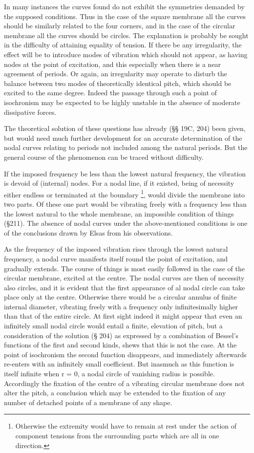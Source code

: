 In many instances the curves found do not exhibit the symmetries demanded by
the supposed conditions.  Thus in the case of the square membrane all the
curves should be similarly related to the four corners, and in the case of the
circular membrane all the curves should be circles.
The explanation is probably be sought in the difficulty of
attaining equality of tension. If there be any irregularity, the effect
will be to introduce modes of vibration which should not appear, as
having nodes at the point of excitation, and this especially when there
is a near agreement of periods. Or again, an irregularity may operate to
disturb the balance between two modes of theoretically identical pitch,
which should be excited to the same degree. Indeed the passage through
such a point of isochronism may be expected to be highly unstable in the
absence of moderate dissipative forces.

The theoretical solution of these questions has already (§§ 19C, 204)
been given, but would need much further development for an accurate
determination of the nodal curves relating to periods not included among
the natural periods. But the general course of the phenomenon can be
traced without difficulty.

If the imposed frequency be less than the lowest natural frequency, the
vibration is devoid of (internal) nodes. For a nodal line, if it
existed, being of necessity either endless or terminated at the boundary
\footnote{Otherwise the extremity would have to remain at rest under the action
of component tensions from the surrounding parts which are all in one direction.},
would divide the membrane into two parts. Of these one part would be
vibrating freely with a frequency less than the lowest natural to the
whole membrane, an impossible condition of things (§211). The absence of
nodal curves under the above-mentioned conditions is one of the
conclusions drawn by Elsas from his observations.

As the frequency of the imposed vibration rises through the lowest
natural frequency, a nodal curve manifests itself round the point of
excitation, and gradually extends. The course of things is most easily
followed in the case of the circular membrane, excited at the centre.
The nodal curves are then of necessity also circles, and it is evident
that the first appearance of al nodal circle can take place only at the
centre. Otherwise there would be a circular annulus of finite internal
diameter, vibrating freely with a frequency only infinitesimally higher
than that of the entire circle. At first sight indeed it might appear
that even an infinitely small nodal circle would entail a finite,
elevation of pitch, but a consideration of the solution (§ 204) as
expressed by a combination of Bessel's functions of the first and second
kinds, shews that this is not the case. At the point of isochronism the
second function disappears, and immediately afterwards re-enters with an
infinitely small coefficient. But inasmuch as this function is itself
infinite when r = 0, a nodal circle of vanishing radius is possible.
Accordingly the fixation of the centre of a vibrating circular
membrane does not alter the pitch, a conclusion which may be extended
to the fixation of any number of detached points of a membrane of any
shape.

